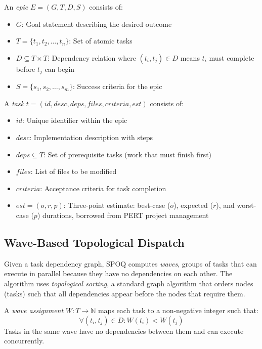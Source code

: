 \begin{definition}[Epic]
\label{def:epic}
An \textit{epic} $E = (G, T, D, S)$ consists of:
\begin{itemize}
    \item $G$: Goal statement describing the desired outcome
    \item $T = \{t_1, t_2, \ldots, t_n\}$: Set of atomic tasks
    \item $D \subseteq T \times T$: Dependency relation where $(t_i, t_j) \in D$
          means $t_i$ must complete before $t_j$ can begin
    \item $S = \{s_1, s_2, \ldots, s_m\}$: Success criteria for the epic
\end{itemize}
\end{definition}

\begin{definition}[Task]
\label{def:task}
A \textit{task} $t = (id, desc, deps, files, criteria, est)$ consists of:
\begin{itemize}
    \item $id$: Unique identifier within the epic
    \item $desc$: Implementation description with steps
    \item $deps \subseteq T$: Set of prerequisite tasks (work that must finish first)
    \item $files$: List of files to be modified
    \item $criteria$: Acceptance criteria for task completion
    \item $est = (o, r, p)$: Three-point estimate: best-case ($o$), expected ($r$),
          and worst-case ($p$) durations, borrowed from PERT project management
\end{itemize}
\end{definition}

\subsection{Wave-Based Topological Dispatch}
\label{subsec:waves}

Given a task dependency graph, SPOQ computes \textit{waves}, groups of tasks
that can execute in parallel because they have no dependencies on each other.
The algorithm uses \textit{topological sorting}, a standard graph algorithm
that orders nodes (tasks) such that all dependencies appear before the nodes
that require them.

\begin{definition}
\label{def:wave}
A \textit{wave assignment} $W: T \rightarrow \mathbb{N}$ maps each task to a
non-negative integer such that:
\begin{equation}
\forall (t_i, t_j) \in D: W(t_i) < W(t_j)
\end{equation}
Tasks in the same wave have no dependencies between them and can execute
concurrently.
\end{definition}

